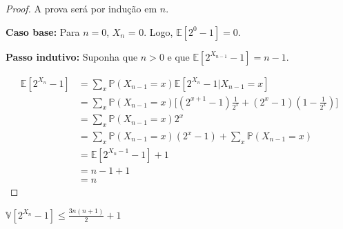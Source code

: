 \begin{proof}
A prova será por indução em $n$. 

\textbf{Caso base:} Para $n = 0$, $X_n$ = 0. Logo, $\mathbb{E}[2^0 - 1] = 0$.

\textbf{Passo indutivo:} Suponha que $n > 0$ e que $\mathbb{E}[2^{X_{n-1}} - 1] = n-1$.

\begin{align*}
  \mathbb{E}[2^{X_n} - 1] 
    &= \sum_{x} \mathbb{P} (X_{n-1} = x) \mathbb{E}[2^{X_n} - 1 | X_{n-1} = x] \\
    &= \sum_{x} \mathbb{P} (X_{n-1} = x) \Big[ (2^{x+1} - 1) \frac{1}{2^x} +  (2^x - 1) (1 - \frac{1}{2^x}) \Big] \\
    &= \sum_{x} \mathbb{P} (X_{n-1} = x) 2^x \\
    &= \sum_{x} \mathbb{P} (X_{n-1} = x) (2^x - 1) + \sum_{x} \mathbb{P} (X_{n-1} = x) \\
    &= \mathbb{E}[2^{X_n-1} - 1] + 1 \\
    &= n - 1 + 1 \\
    &= n
\end{align*}

\end{proof}

\begin{lemma}
$\mathbb{V}[2^{X_n} - 1] \leq \frac{3n(n+1)}{2} + 1$
\end{lemma}

